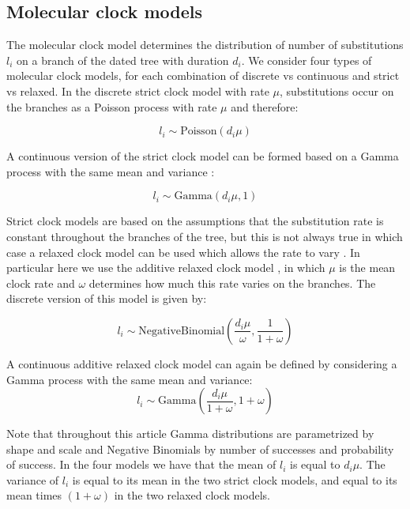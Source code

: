 \documentclass{article}
\begin{document}
\subsection*{Molecular clock models}

The molecular clock model determines the distribution of number of substitutions $l_i$ on a branch of the dated
tree with duration $d_i$. We consider four types of molecular clock models, for each combination of discrete
vs continuous and strict vs relaxed. In the discrete strict clock
model \citep{Zuckerkandl1962} with rate $\mu$,
substitutions occur on the branches as a Poisson process with rate $\mu$ and therefore:

\begin{equation}
l_i \sim \mathrm{Poisson}(d_i \mu)
\label{eq:sc}
\end{equation}

A continuous version of the strict clock model can be formed based on a Gamma process with the same mean and variance \citep{Didelot2021}:

\begin{equation}
l_i \sim \mathrm{Gamma}(d_i \mu,1)
\label{eq:csc}
\end{equation}

Strict clock models are based on the assumptions that the substitution rate is constant throughout the branches
of the tree, but this is not always true in which case a relaxed clock model can be used which allows
the rate to vary \citep{Drummond2006}. In particular here we use the additive relaxed clock model \citep{Didelot2021},
in which $\mu$ is the mean clock rate and $\omega$ determines how much this rate varies on the branches.
The discrete version of this model is given by: 

\begin{equation}
l_i \sim \mathrm{NegativeBinomial}\left(\frac{d_i \mu}{\omega},\frac{1}{1+\omega}\right)
\label{eq:arc}
\end{equation}

A continuous additive relaxed clock model can again be defined by considering a Gamma process with the same mean and variance:
\begin{equation}
l_i \sim \mathrm{Gamma}\left(\frac{d_i \mu}{1+\omega},1+\omega\right)
\label{eq:carc}
\end{equation}

Note that throughout this article Gamma distributions are parametrized by shape and scale and Negative Binomials 
by number of successes and probability of success. In the four models we have that the mean of $l_i$ is equal to
$d_i \mu$. The variance of $l_i$ is equal to its mean in the two strict clock models, and equal to its mean 
times $(1+\omega)$ in the two relaxed clock models.
\end{document}
